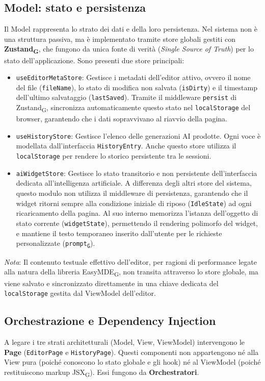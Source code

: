 \documentclass[11pt,a4paper]{article}
\newcommand{\gls}[1]{#1\textsubscript{G}}
\begin{document}
\subsection{Model: stato e persistenza}
Il Model rappresenta lo strato dei dati e della loro persistenza. Nel sistema non è una struttura passiva, ma è implementato tramite store globali gestiti con \textbf{\gls{Zustand}}, che fungono da unica fonte di verità (\textit{Single Source of Truth}) per lo stato dell'applicazione.
Sono presenti due store principali:
\begin{itemize}
    \item \texttt{useEditorMetaStore}: Gestisce i metadati dell'editor attivo, ovvero il nome del file (\texttt{fileName}), lo stato di modifica non salvata (\texttt{isDirty}) e il timestamp dell'ultimo salvataggio (\texttt{lastSaved}). Tramite il middleware \texttt{persist} di \gls{Zustand}, sincronizza automaticamente questo stato nel \texttt{localStorage} del browser, garantendo che i dati sopravvivano al riavvio della pagina.
    \item \texttt{useHistoryStore}: Gestisce l'elenco delle generazioni AI prodotte. Ogni voce è modellata dall'interfaccia \texttt{HistoryEntry}. Anche questo store utilizza il \texttt{localStorage} per rendere lo storico persistente tra le sessioni.
    \item \texttt{aiWidgetStore}: Gestisce lo stato transitorio e non persistente dell'interfaccia dedicata all'intelligenza artificiale. A differenza degli altri store del sistema, questo modulo non utilizza il middleware di persistenza, garantendo che il widget ritorni sempre alla condizione iniziale di riposo (\texttt{IdleState}) ad ogni ricaricamento della pagina. Al suo interno memorizza l'istanza dell'oggetto di stato corrente (\texttt{widgetState}), permettendo il rendering polimorfo del widget, e mantiene il testo temporaneo inserito dall'utente per le richieste personalizzate (\texttt{\gls{prompt}}).
\end{itemize}

\textit{Nota}: Il contenuto testuale effettivo dell'editor, per ragioni di performance legate alla natura della libreria \gls{EasyMDE}, non transita attraverso lo store globale, ma viene salvato e sincronizzato direttamente in una chiave dedicata del \texttt{localStorage} gestita dal ViewModel dell'editor.


\newpage

\subsection{Orchestrazione e Dependency Injection}
A legare i tre strati architetturali (Model, View, ViewModel) intervengono le \textbf{Page} (\texttt{EditorPage} e \texttt{HistoryPage}). Questi componenti non appartengono né alla View pura (poiché conoscono lo stato globale e gli hook) né al ViewModel (poiché restituiscono markup \gls{JSX}). Essi fungono da \textbf{Orchestratori}.
\end{document}
